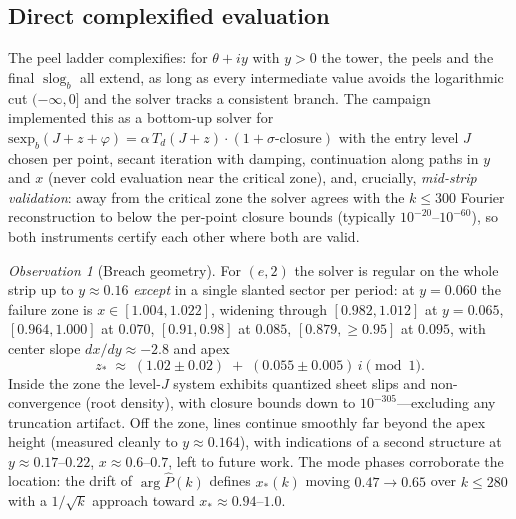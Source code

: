 \documentclass[11pt,a4paper]{article}
\theoremstyle{definition}
\theoremstyle{remark}
\newtheorem{observation}[theorem]{Observation}
\newcommand{\slog}{\operatorname{slog}}
\begin{document}
\subsection{Direct complexified evaluation}

The peel ladder complexifies: for $\theta+iy$ with $y>0$ the tower, the peels and the final
$\slog_b$ all extend, as long as every intermediate value avoids the logarithmic cut
$(-\infty,0]$ and the solver tracks a consistent branch. The campaign implemented this as a
bottom-up solver for $\mathrm{sexp}_b(J+z+\varphi)=\alpha\,T_d(J+z)\cdot(1+\sigma\text{-closure})$
with the entry level $J$ chosen per point, secant iteration with damping, continuation along
paths in $y$ and $x$ (never cold evaluation near the critical zone), and, crucially,
\emph{mid-strip validation}: away from the critical zone the solver agrees with the
$k\le300$ Fourier reconstruction to below the per-point closure bounds (typically
$10^{-20}$--$10^{-60}$), so both instruments certify each other where both are valid.

\begin{observation}[Breach geometry]\label{obs:breach}
For $(e,2)$ the solver is regular on the whole strip up to $y\approx0.16$ \emph{except} in a
single slanted sector per period: at $y=0.060$ the failure zone is
$x\in[1.004,1.022]$, widening through $[0.982,1.012]$ at $y=0.065$, $[0.964,1.000]$ at
$0.070$, $[0.91,0.98]$ at $0.085$, $[0.879,\ge0.95]$ at $0.095$, with center slope
$dx/dy\approx-2.8$ and apex
\[
z_*\;\approx\;(1.02\pm0.02)\;+\;(0.055\pm0.005)\,i \pmod 1 .
\]
Inside the zone the level-$J$ system exhibits quantized sheet slips and non-convergence
(root density), with closure bounds down to $10^{-305}$---excluding any truncation artifact.
Off the zone, lines continue smoothly far beyond the apex height (measured cleanly to
$y\approx0.164$), with indications of a second structure at $y\approx0.17$--$0.22$,
$x\approx0.6$--$0.7$, left to future work. The mode phases corroborate the location: the
drift of $\arg\widehat P(k)$ defines $x_*(k)$ moving $0.47\to0.65$ over $k\le280$ with a
$1/\sqrt k$ approach toward $x_*\approx0.94$--$1.0$.
\end{observation}
\end{document}
